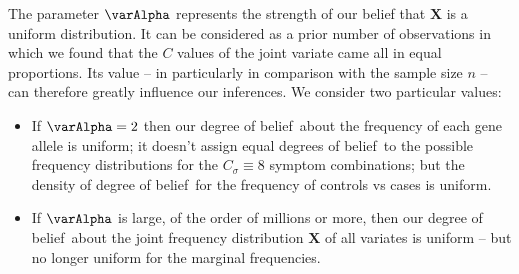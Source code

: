 \documentclass[\ifafour a4paper,12pt,\else a5paper,10pt,\fi%
onecolumn,oneside,article,%
british%
]{memoir}
\makeatletter
\theoremstyle{remark}
\theoremstyle{innote}
\def\sum{\DOTSI\sumop\slimits@}
\def\prod{\DOTSI\prodop\slimits@}
\newcommand*{\delt}{\deltaup}%
\newcommand*{\di}{\mathrm{d}}%
\newcommand*{\pf}{\mathrm{p}}%
\renewcommand*{\|}{\mathpunct{|}}
\newcommand*{\tprod}{\mathop{\textstyle\prod}\nolimits}
\newcommand*{\tsum}{\mathop{\textstyle\sum}\nolimits}
\newcommand*{\dob}{degree of belief}
\newcommand*{\dobs}{degrees of belief}
\newcommand*{\ysum}{\tsum}
\newcommand*{\yprod}{\tprod}
\newcommand*{\yFs}{\bm{S}}
\newcommand*{\yF}{\bm{X}}
\newcommand*{\yCs}{C_{\sigma}}
\newcommand*{\yIo}{I_{0}}
\newcommand*{\yA}{\varAlpha}
\makeatother
\begin{document}
The parameter $\yA$ represents the strength of our belief that $\yF$ is a
uniform distribution. It can be considered as a prior number of
observations in which we found that the $C$ values of the joint variate
came all in equal proportions. Its value -- in particularly in comparison
with the sample size $n$ -- can therefore greatly influence
our inferences. We consider two particular values:
\begin{itemize}[label=--]
\item If $\yA=2$ then our \dob\ about the frequency of each gene allele is
  uniform; it doesn't assign equal \dobs\ to the possible frequency
  distributions for the $\yCs\equiv 8$ symptom combinations; %
  but the density of \dob\ for the frequency of controls vs cases is
  uniform.
\item If $\yA$ is large, of the order of millions or more, then our \dob\
  about the joint frequency distribution $\yF$ of all variates is uniform
  -- but no longer uniform for the marginal frequencies.
\end{itemize}


\end{document}
